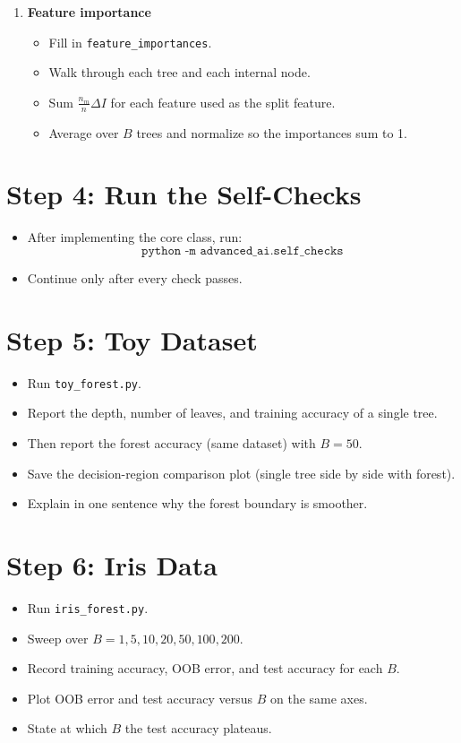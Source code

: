 \begin{enumerate}[label=\textbf{T\arabic*.}]
  \item \textbf{Feature importance}
\begin{itemize}
  \item Fill in \texttt{feature\_importances}.
  \item Walk through each tree and each internal node.
  \item Sum $\frac{n_m}{n}\Delta I$ for each feature used as the split feature.
  \item Average over $B$ trees and normalize so the importances sum to 1.
\end{itemize}
\end{enumerate}

\section*{Step 4: Run the Self-Checks}
\begin{itemize}
  \item After implementing the core class, run:
  \[
    \texttt{python -m advanced\_ai.self\_checks}
  \]
  \item Continue only after every check passes.
\end{itemize}

\section*{Step 5: Toy Dataset}
\begin{itemize}
  \item Run \texttt{toy\_forest.py}.
  \item Report the depth, number of leaves, and training accuracy of a single tree.
  \item Then report the forest accuracy (same dataset) with $B=50$.
  \item Save the decision-region comparison plot (single tree side by side with forest).
  \item Explain in one sentence why the forest boundary is smoother.
\end{itemize}

\section*{Step 6: Iris Data}
\begin{itemize}
  \item Run \texttt{iris\_forest.py}.
  \item Sweep over $B = 1, 5, 10, 20, 50, 100, 200$.
  \item Record training accuracy, OOB error, and test accuracy for each $B$.
  \item Plot OOB error and test accuracy versus $B$ on the same axes.
  \item State at which $B$ the test accuracy plateaus.
\end{itemize}

